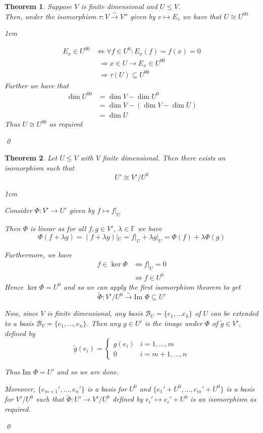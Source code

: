 \documentclass[11pt, a4paper]{report}
\makeatletter
\numberwithin{equation}{section}
\newcommand{\B}{\mathcal{B}}
\newcommand{\F}{\mathbb{F}}
\newcommand{\im}{\text{Im }}
\numberwithin{equation}{subsection}
\theoremstyle{plain}
\newtheorem{thm}{Theorem}[chapter] %
\theoremstyle{definition}
\theoremstyle{remark}
\newtheorem*{prf}{Proof}
\renewenvironment{prf}[1][\proofname]{\par
  \vspace{-\topsep}%
  \normalfont
  \topsep0pt \partopsep0pt %
  \trivlist
  \item[\hskip\labelsep
        \itshape
    #1\@addpunct{.}]\ignorespaces
}{%
  \popQED\endtrivlist\@endpefalse
  \addvspace{6pt plus 6pt} %
}
\newcommand{\pr}[1]{\begin{adjustwidth}{1cm}{} \begin{prf} #1 \end{prf} \end{adjustwidth}}
\makeatother
\begin{document}
\begin{thm}
Suppose $V$ is finite dimensional and $U \leq V$.\\ Then, under the isomorphism $\tau: V \xrightarrow{\sim} V''$ given by $v \mapsto E_v$ we have that $U \cong U^{00}$

\pr{
\begin{align*}
E_x \in U^{00}	&\iff \forall f \in U^0 : E_x(f) = f(x) = 0\\
				&\;\,\Longrightarrow x \in U \to E_x \in U^{00}\\
				&\;\,\Longrightarrow \tau(U) \subseteq U^{00}
\end{align*}
Further we have that
\begin{align*}
\dim U^{00}	&= \dim V - \dim U^0\\
			&= \dim V - (\dim V - \dim U)\\
			&= \dim U
\end{align*}
Thus $U \cong U^{00}$ as required
}\qed
\end{thm}

\newpage

\begin{thm}
Let $U \leq V$ with $V$ finite dimensional. Then there exists an isomorphism such that $$U' \cong V'/U^0$$

\pr{
Consider $\Phi : V' \to U'$ given by $f \mapsto f|_U$

Then $\Phi$ is linear as for all $f,g \in V'$, $\lambda \in \F$ we have
$$\Phi(f + \lambda g) = (f + \lambda g)|_U = f|_U + \lambda g|_U = \Phi(f) + \lambda \Phi(g)$$

Furthermore, we have
\begin{align*}
f \in \ker \Phi	&\iff f|_U = 0\\
					&\iff f \in U^0
\end{align*}
Hence $\ker \Phi = U^0$ and so we can apply the first isomorphism theorem to get
$$\tilde{\Phi}: V'/U^0 \xrightarrow{\sim} \im \Phi \subseteq U'$$

Now, since $V$ is finite dimensional, any basis $\B_U = \{ e_1, \ldots e_k \}$ of $U$ can be extended to a basis $\B_V = \{ e_1, \ldots, e_n \}$. Then any $g \in U'$ is the image under $\Phi$ of $\tilde{g} \in V'$, defined by $$\tilde{g}(e_i) = \begin{cases} g(e_i) & i = 1, \ldots, m \\ 0 & i = m+1, \ldots, n \end{cases}$$

Thus $\im \Phi = U'$ and so we are done.

Moreover, $\{ e_{m+1}', \ldots, e_n' \}$ is a basis for $U^0$ and $\{ e_1' + U^0, \ldots, e_m' + U^0 \}$ is a basis for $V'/U^0$ such that $\tilde{\Phi}: U' \to V'/U^0$ defined by $e_i' \mapsto e_i' + U^0$ is an isomorphism as required.

}\qed
\end{thm}
\end{document}
